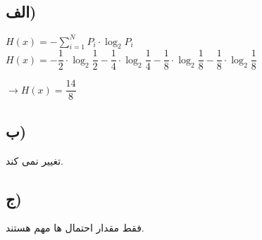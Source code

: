 \def \Subject {}


\section{\Subject}

\subsection{الف)}


 \null \hfill $ H(x) = -\sum_{i=1}^{N}  P_i \cdot \log_{2} P_i $ \\
 


\null \hfill $ H(x) = - \dfrac{1}{2} \cdot \log_{2} \dfrac{1}{2} - \dfrac{1}{4} \cdot \log_{2} \dfrac{1}{4} - \dfrac{1}{8} \cdot \log_{2} \dfrac{1}{8} - \dfrac{1}{8} \cdot \log_{2} \dfrac{1}{8} $

\null \hfill $ \rightarrow H(x) = \dfrac{14}{8} $

\subsection{ب)}
 تغییر نمی کند.
\subsection{ج)}
فقط مقدار احتمال ها مهم هستند.